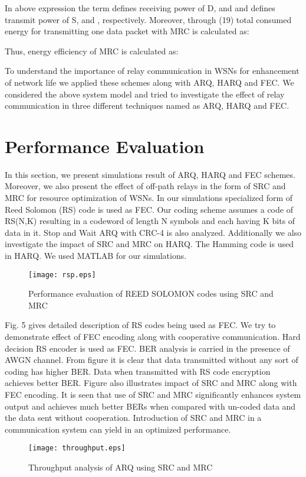 \documentclass{sig-alternate}
\begin{document}
\normalsize

In above expression the term  defines receiving power of D,  and  and  defines transmit power of S,  and , respectively. Moreover, through (19) total consumed energy for transmitting one data packet with MRC is calculated as:
\small

\normalsize

Thus, energy efficiency of MRC is calculated as:


To understand the importance of relay communication in WSNs for enhancement of network life we applied these schemes along with ARQ, HARQ and FEC.
We considered the above system model and tried to investigate the effect of relay communication in three different techniques named as ARQ, HARQ and FEC.

\section{Performance Evaluation}
In this section, we present simulations result of ARQ, HARQ and FEC schemes. Moreover, we also present the effect of off-path relays in the form of SRC and MRC for resource optimization of WSNs. In our simulations specialized form of Reed Solomon (RS) code is used as FEC. Our coding scheme assumes a code of RS(N,K) resulting in a codeword of length N symbols and each having K bits of data in it. Stop and Wait ARQ with CRC-4 is also analyzed. Additionally we also investigate the impact of SRC and MRC on HARQ. The  Hamming code is used in HARQ. We used MATLAB for our simulations.

\begin{figure}[!ht]
  \centering
  \texttt{[image: rsp.eps]}
   \vspace{-.5cm}
  \caption{Performance evaluation of REED SOLOMON codes using SRC and MRC}
\end{figure}

Fig. 5 gives detailed description of RS codes being used as FEC. We try to demonstrate effect of FEC encoding along with cooperative communication. Hard decision RS encoder is used as FEC. BER analysis is carried in the presence of AWGN channel. From figure it is clear that data transmitted without any sort of coding has higher BER. Data when transmitted with RS code encryption achieves better BER. Figure also illustrates impact of SRC and MRC along with FEC encoding. It is seen that use of SRC and MRC significantly enhances system output and achieves much better BERs when compared with un-coded data and the data sent without cooperation. Introduction of SRC and MRC in a communication system can yield in an optimized performance.
\begin{figure}[!t]
  \centering
  \texttt{[image: throughput.eps]}
  \vspace{-.5cm}
  \caption{Throughput analysis of ARQ using SRC and MRC}
\end{figure}
\end{document}
